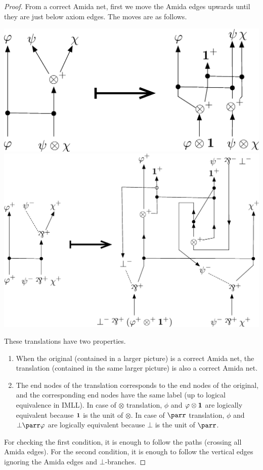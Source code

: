  \begin{proof}
  From a correct Amida net, first we move the Amida edges upwards
  until they are just below axiom edges.
The moves are as follows.
 \begin{center}
\includegraphics[scale=0.4]{tensor-move.eps}
\vskip 3cm
\includegraphics[scale=0.35]{parr-move.eps}
 \end{center}
These translations have two properties.
\begin{enumerate}
 \item When the original (contained in a larger picture)
       is a correct Amida net, the translation (contained in the same
       larger picture) is also a correct Amida net.
 \item The end nodes of the translation corresponds to the end nodes of
       the original, and the corresponding end nodes have the same label
       (up to logical equivalence in IMLL).  In case of $\otimes$
       translation, $\phi$ and
       $\varphi\otimes \mathbf{1}$ are logically equivalent because $\mathbf{1}$ is the
       unit of $\otimes$.
       In case of $\parr$ translation, $\phi$ and $\bot\parr \phi$ are
       logically equivalent because $\bot$ is the unit of $\parr$.
\end{enumerate}
For checking the first condition, it is enough to follow the paths
(crossing all Amida edges).
For the second condition, it is enough to follow the vertical edges
ignoring the Amida edges and $\bot$-branches.


\end{proof}
